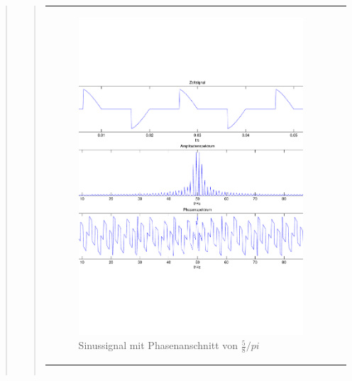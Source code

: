 \begin{quote}
\begin{quote}
\begin{center}
\begin{tabular}{ll}
\begin{minipage}{0.6\textwidth}
                   \begin{figure}[H]
                        \label{fig:}
                        \includegraphics[scale=0.3]{./Bilder/Phasenanschnitt58pi.pdf} %
                        \caption{Sinussignal mit Phasenanschnitt von $\frac{5}{8}/pi$}
                    \end{figure}
                 \vspace{-1.5em}

                \end{minipage}

            \end{tabular}
            \end{center}

            \begin{center}
            \begin{tabular}{ll}


\end{tabular}
\end{center}
\end{quote}
\end{quote}
